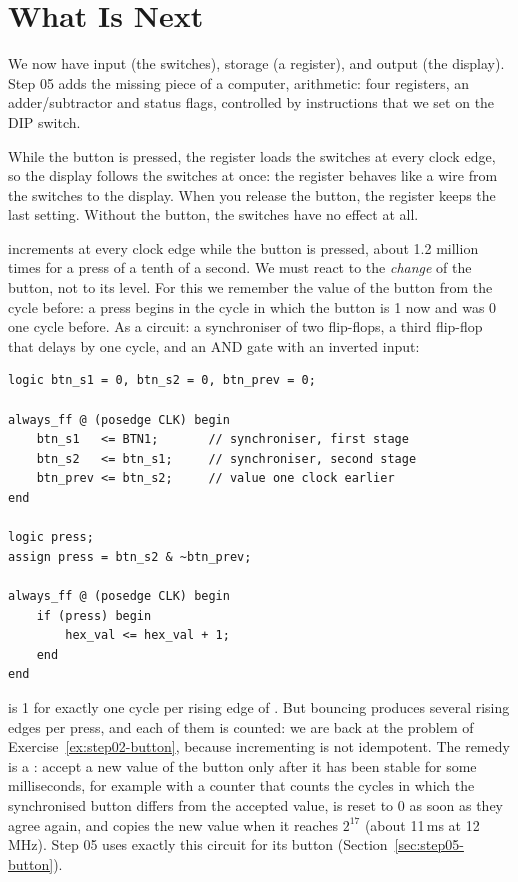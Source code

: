 \section{What Is Next}

We now have input (the switches), storage (a register), and output (the
display). Step 05 adds the missing piece of a computer, arithmetic: four
registers, an adder/subtractor and status flags, controlled by instructions
that we set on the DIP switch.

\solutions

\solution
While the button is pressed, the register loads the switches at every clock
edge, so the display follows the switches at once: the register behaves like
a wire from the switches to the display. When you release the button, the
register keeps the last setting. Without the button, the switches have no
effect at all.

\solution
{} increments at every clock edge while the
button is pressed, about 1.2 million times for a press of a tenth of a
second. We must react to the \emph{change} of the button, not to its level.
For this we remember the value of the button from the cycle before: a press
begins in the cycle in which the button is 1 now and was 0 one cycle before.
As a circuit: a synchroniser of two flip-flops, a third flip-flop that delays
by one cycle, and an AND gate with an inverted input:
\begin{lstlisting}
logic btn_s1 = 0, btn_s2 = 0, btn_prev = 0;

always_ff @ (posedge CLK) begin
    btn_s1   <= BTN1;       // synchroniser, first stage
    btn_s2   <= btn_s1;     // synchroniser, second stage
    btn_prev <= btn_s2;     // value one clock earlier
end

logic press;
assign press = btn_s2 & ~btn_prev;

always_ff @ (posedge CLK) begin
    if (press) begin
        hex_val <= hex_val + 1;
    end
end
\end{lstlisting}
 is 1 for exactly one cycle per rising edge of . But
bouncing produces several rising edges per press, and each of them is
counted: we are back at the problem of Exercise~\ref{ex:step02-button},
because incrementing is not idempotent. The remedy is a :
accept a new value of the button only after it has been stable for some
milliseconds, for example with a counter that counts the cycles in which the
synchronised button differs from the accepted value, is reset to 0 as soon as
they agree again, and copies the new value when it reaches $2^{17}$ (about
11\,ms at 12\,MHz). Step 05 uses exactly this circuit for its button
(Section~\ref{sec:step05-button}).
